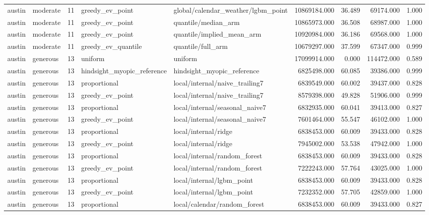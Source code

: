 \begin{tabular}{llrllrrrr}
austin & moderate & 11 & greedy\_ev\_point & global/calendar\_weather/lgbm\_point & 10869184.000 & 36.489 & 69174.000 & 1.000 \\
austin & moderate & 11 & greedy\_ev\_point & quantile/median\_arm & 10865973.000 & 36.508 & 68987.000 & 1.000 \\
austin & moderate & 11 & greedy\_ev\_point & quantile/implied\_mean\_arm & 10920984.000 & 36.186 & 69568.000 & 1.000 \\
austin & moderate & 11 & greedy\_ev\_quantile & quantile/full\_arm & 10679297.000 & 37.599 & 67347.000 & 0.999 \\
austin & generous & 13 & uniform & uniform & 17099914.000 & 0.000 & 114472.000 & 0.589 \\
austin & generous & 13 & hindsight\_myopic\_reference & hindsight\_myopic\_reference & 6825498.000 & 60.085 & 39386.000 & 0.999 \\
austin & generous & 13 & proportional & local/internal/naive\_trailing7 & 6839549.000 & 60.002 & 39437.000 & 0.828 \\
austin & generous & 13 & greedy\_ev\_point & local/internal/naive\_trailing7 & 8579398.000 & 49.828 & 51906.000 & 0.999 \\
austin & generous & 13 & proportional & local/internal/seasonal\_naive7 & 6832935.000 & 60.041 & 39413.000 & 0.827 \\
austin & generous & 13 & greedy\_ev\_point & local/internal/seasonal\_naive7 & 7601464.000 & 55.547 & 46102.000 & 1.000 \\
austin & generous & 13 & proportional & local/internal/ridge & 6838453.000 & 60.009 & 39433.000 & 0.828 \\
austin & generous & 13 & greedy\_ev\_point & local/internal/ridge & 7945002.000 & 53.538 & 47942.000 & 1.000 \\
austin & generous & 13 & proportional & local/internal/random\_forest & 6838453.000 & 60.009 & 39433.000 & 0.828 \\
austin & generous & 13 & greedy\_ev\_point & local/internal/random\_forest & 7222243.000 & 57.764 & 43025.000 & 1.000 \\
austin & generous & 13 & proportional & local/internal/lgbm\_point & 6838453.000 & 60.009 & 39433.000 & 0.828 \\
austin & generous & 13 & greedy\_ev\_point & local/internal/lgbm\_point & 7232352.000 & 57.705 & 42859.000 & 1.000 \\
austin & generous & 13 & proportional & local/calendar/random\_forest & 6838453.000 & 60.009 & 39433.000 & 0.827 \\

\end{tabular}
